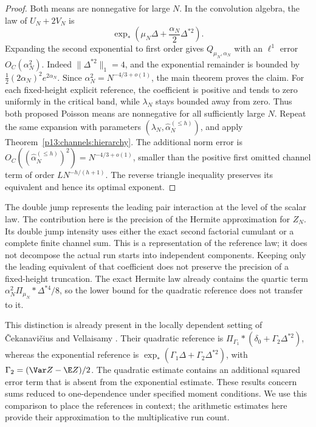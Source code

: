 \begin{proof}
Both means are nonnegative for large \(N\).
In the convolution algebra, the law of \(U_N+2V_N\) is
\[
 \exp_*\left(\mu_N\Delta+\frac{\alpha_N}{2}\Delta^{*2}\right).
\]
Expanding the second exponential to first order gives
\(Q_{\mu_N,\alpha_N}\) with an \(\ell^1\) error
\(O_C(\alpha_N^2)\). Indeed \(\|\Delta^{*2}\|_1=4\),
and the exponential remainder is bounded by
\(\frac12(2\alpha_N)^2e^{2\alpha_N}\).
Since \(\alpha_N^2=N^{-4/3+o(1)}\), the main theorem
proves the claim.
For each fixed-height explicit reference, the coefficient
is positive and tends to zero uniformly in the critical band, while
\(\lambda_N\) stays bounded away from zero. Thus both proposed
Poisson means are nonnegative for all sufficiently large \(N\).
Repeat the same expansion with parameters
\((\lambda_N,\widehat\alpha_N^{(\le h)})\), and apply
Theorem~\ref{p13:channels:hierarchy}. The additional norm
error is \(O_C((\widehat\alpha_N^{(\le h)})^2)
=N^{-4/3+o(1)}\), smaller than the positive first omitted
channel term of order \(LN^{-h/(h+1)}\).
The reverse triangle inequality preserves its equivalent
and hence its optimal exponent.
\end{proof}

The double jump represents the leading pair interaction at
the level of the scalar law. The contribution here is the
precision of the Hermite approximation for \(Z_N\).
Its double jump intensity uses either the exact second
factorial cumulant or a complete finite channel sum.
This is a representation of the reference law; it does not
decompose the actual run starts into independent components.
Keeping only the leading equivalent of that coefficient
does not preserve the precision of a fixed-height truncation.
The exact Hermite law already contains the quartic term
\(\alpha_N^2\Pi_{\mu_N}*\Delta^{*4}/8\), so the lower
bound for the quadratic reference does not transfer to it.

This distinction is already present in the locally dependent
setting of \v{C}ekanavi\v{c}ius and Vellaisamy
\cite[Theorem~3.1, (3.5), and Theorem~3.2, (3.6)]{cekanaviciusvellaisamy2015}.
Their quadratic reference is
\(\Pi_{\Gamma_1}*(\delta_0+\Gamma_2\Delta^{*2})\), whereas
the exponential reference is
\(\exp_*(\Gamma_1\Delta+\Gamma_2\Delta^{*2})\), with
\(\Gamma_2=(\Var Z-\E Z)/2\).
The quadratic estimate contains an additional squared error term
that is absent from the exponential estimate.
These results concern sums reduced to one-dependence under
specified moment conditions. We use this comparison to place the
references in context; the arithmetic estimates here provide
their approximation to the multiplicative run count.

